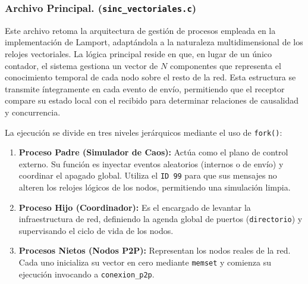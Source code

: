 \subsubsection{Archivo Principal. (\texttt{sinc\_vectoriales.c})}

Este archivo retoma la arquitectura de gestión de procesos empleada en la implementación de Lamport, adaptándola a la naturaleza multidimensional de los relojes vectoriales. La lógica principal reside en que, en lugar de un único contador, el sistema gestiona un vector de $N$ componentes que representa el conocimiento temporal de cada nodo sobre el resto de la red. Esta estructura se transmite íntegramente en cada evento de envío, permitiendo que el receptor compare su estado local con el recibido para determinar relaciones de causalidad y concurrencia.

La ejecución se divide en tres niveles jerárquicos mediante el uso de \texttt{fork()}:

\begin{enumerate}
    \item \textbf{Proceso Padre (Simulador de Caos):} Actúa como el plano de control externo. Su función es inyectar eventos aleatorios (internos o de envío) y coordinar el apagado global. Utiliza el \texttt{ID 99} para que sus mensajes no alteren los relojes lógicos de los nodos, permitiendo una simulación limpia.
    \item \textbf{Proceso Hijo (Coordinador):} Es el encargado de levantar la infraestructura de red, definiendo la agenda global de puertos (\texttt{directorio}) y supervisando el ciclo de vida de los nodos.
    \item \textbf{Procesos Nietos (Nodos P2P):} Representan los nodos reales de la red. Cada uno inicializa su vector en cero mediante \texttt{memset} y comienza su ejecución invocando a \texttt{conexion\_p2p}.
\end{enumerate}

